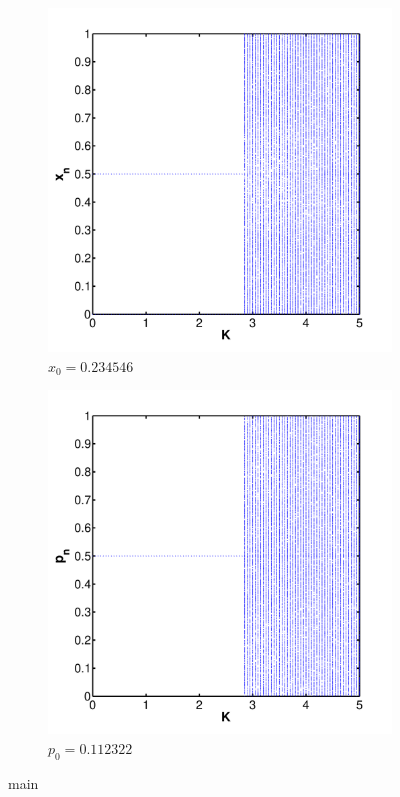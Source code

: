 \begin{figure}
	\centering
	\begin{subfigure}{\columnwidth}
		\centering
			\includegraphics[width=\textwidth]{./img/assignment_b_dim_0_b_x}
			\caption{$x_0 = \num{0.234546}$}
			\label{fig:experiment:bifurcation:x}
	\end{subfigure}
	\begin{subfigure}{\columnwidth}
		\centering
			\includegraphics[width=\textwidth]{./img/assignment_b_dim_0_b_p}
			\caption{$p_0 = \num{0.112322}$}
			\label{fig:experiment:bifurcation:p}
	\end{subfigure}
	\caption{main}
	\label{fig:experiment:bifurcation}
\end{figure}

